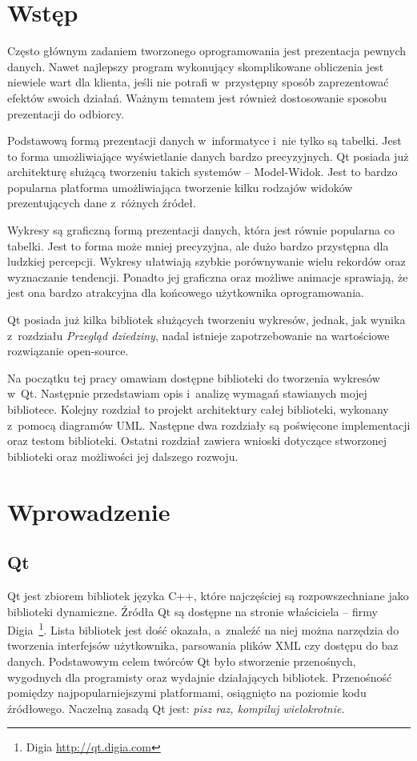 \chapter*{Wstęp}
Często głównym zadaniem tworzonego oprogramowania jest prezentacja pewnych danych. Nawet najlepszy program wykonujący skomplikowane obliczenia jest niewiele wart dla klienta, jeśli nie potrafi w~przystępny sposób zaprezentować efektów swoich działań. Ważnym tematem jest również dostosowanie sposobu prezentacji do odbiorcy.
 
Podstawową formą prezentacji danych w~informatyce i~nie tylko są tabelki. Jest to forma umożliwiające wyświetlanie danych bardzo precyzyjnych. Qt posiada już architekturę służącą tworzeniu takich systemów -- Model-Widok. Jest to bardzo popularna platforma umożliwiająca tworzenie kilku rodzajów widoków prezentujących dane z~różnych źródeł.

Wykresy są graficzną formą prezentacji danych, która jest równie popularna co tabelki. Jest to forma może mniej precyzyjna, ale dużo bardzo przystępna dla ludzkiej percepcji. Wykresy ułatwiają szybkie porównywanie wielu rekordów oraz wyznaczanie tendencji. Ponadto jej graficzna oraz możliwe animacje sprawiają, że jest ona bardzo atrakcyjna dla końcowego użytkownika oprogramowania.

Qt posiada już kilka bibliotek służących tworzeniu wykresów, jednak, jak wynika z~rozdziału \textit{Przegląd dziedziny}, nadal istnieje zapotrzebowanie na wartościowe rozwiązanie open-source.

Na początku tej pracy omawiam dostępne biblioteki do tworzenia wykresów w~Qt. Następnie przedstawiam opis i~analizę wymagań stawianych mojej bibliotece. Kolejny rozdział to projekt architektury całej biblioteki, wykonany z~pomocą diagramów UML. Następne dwa rozdziały są poświęcone implementacji oraz testom biblioteki. Ostatni rozdział zawiera wnioski dotyczące stworzonej biblioteki oraz możliwości jej dalszego rozwoju. 

\chapter{Wprowadzenie}
\section{Qt}
Qt jest zbiorem bibliotek języka C++, które najczęściej są rozpowszechniane jako biblioteki dynamiczne. Źródła Qt są dostępne na stronie właściciela -- firmy Digia~\footnote{Digia \url{http://qt.digia.com}}. Lista bibliotek jest dość okazała, a~znaleźć na niej można narzędzia do tworzenia interfejsów użytkownika, parsowania plików XML czy dostępu do baz danych. Podstawowym celem twórców Qt było stworzenie przenośnych, wygodnych dla programisty oraz wydajnie działających bibliotek. Przenośność pomiędzy najpopularniejszymi platformami, osiągnięto na poziomie kodu źródłowego. Naczelną zasadą Qt jest: \textit{pisz raz, kompiluj wielokrotnie}. 

